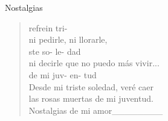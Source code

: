 \begin{song}{Nostalgias}
\begin{verse}{refrein}
	\hspace*{5.8em}tri-\\
	 ni pedirle, ni llorarle,\\
	\hspace*{2.2em} ste so- le- dad\\
	ni decirle que no puedo más vivir...\\
	\hspace*{3em} de\hspace{0.5em} mi\hspace{2em} juv- en- tud\\
	Desde mi triste soledad, veré caer\\
	las rosas muertas de mi juventud.\hspace{1em}\hspace{2.9em}\hspace{1.5em}\hspace{1.7em}\\
	\hspace*{13em} Nostalgias   de mi amor\_\_\_\_\_\_\_\_

\end{verse}
\end{song}

